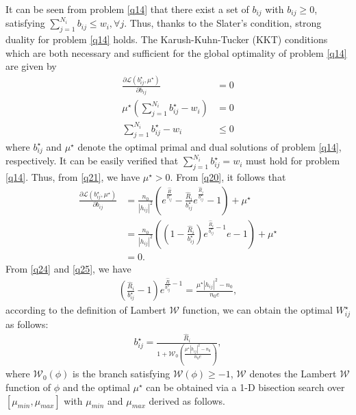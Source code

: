 \documentclass[journal]{IEEEtran}
\begin{document}
It can be seen from problem \eqref{q14} that there exist a set of $b_{ij}$ with $b_{ij} \geq 0$, satisfying $\sum\limits_{j = 1}^{N_i} b_{ij} \leq w_i, \forall j$. Thus, thanks to the Slater's condition, strong duality for problem \eqref{q14} holds. The Karush-Kuhn-Tucker (KKT) conditions which are both necessary and 	sufficient for the  global optimality of problem \eqref{q14} are given by
\begin{align}
\frac{\partial \mathcal{L}\left({b_{ij}^\star}, \mu^\star\right)}{\partial b_{ij}} &= 0 \label{q20} \\
\mu^\star\left(\sum\limits_{j = 1}^{N_i}b_{ij}^\star - w_i\right) &= 0 \label{q21} \\
\sum\limits_{j = 1}^{N_i}b_{ij}^\star - w_i & \leq 0 \label{q22}
\end{align} 
where $b_{ij}^\star$ and $\mu^\star$ denote the optimal primal and dual solutions of problem \eqref{q14}, respectively. It can be easily verified that $\sum\limits_{j = 1}^{N_i} b_{ij}^\star = w_i$ must hold for problem \eqref{q14}. Thus, from \eqref{q21}, we have $\mu^\star > 0$. From \eqref{q20}, it follows that 
\begin{align}
\frac{\partial \mathcal{L} \left(b_{ij}^\star, \mu^\star \right)}{\partial b_{ij}} &= \frac{n_0}{\left|h_{ij}\right|^2} \left(e^{\frac{\hat{R}}{b_{ij}^\star}} -  \frac{\hat{R}_i}{b_{ij}^\star} e^{\frac{\hat{R}_i}{b_{ij}^\star}} - 1\right) + \mu^\star \label{q24} \\
& =  \frac{n_0}{\left|h_{ij}\right|^2}\left(\left(1 - \frac{\hat{R}_i}{b_{ij}^\star}\right)e^{\frac{\hat{R}_i}{b_{ij}^\star} - 1}e - 1\right) + \mu^\star \\
& = 0. \label{q25}
\end{align}
From \eqref{q24} and \eqref{q25}, we have
\begin{align}
\left(\frac{\hat{R}_i}{b_{ij}^\star} - 1\right) e^{\frac{\hat{R}}{b_{ij}^\star} - 1} = \frac{\mu^\star \left|h_{ij}\right|^2 - n_0}{n_0 e},
\end{align}
according to the definition of Lambert $\mathcal{W}$ function, we can obtain the optimal $W_{ij}^\star$ as follows:
\begin{align}
b_{ij}^\star = \frac{\hat{R}_i}{1 + \mathcal{W}_0\left(\frac{\mu^\star \left|h_{ij}\right|^2 - n_0}{n_0 e}\right)} \label{q29},
\end{align}
where $\mathcal{W}_0\left(\phi\right)$ is the branch satisfying $\mathcal{W}\left(\phi\right) \geq -1$, $\mathcal{W}$ denotes the Lambert $\mathcal{W}$ function of $\phi$ \cite{RMCorless} and the optimal $\mu^\star$ can be obtained via a 1-D bisection search over $\left[\mu_{min}, \mu_{max}\right]$ with $\mu_{min} $ and $\mu_{max}$ derived as follows.
\end{document}
